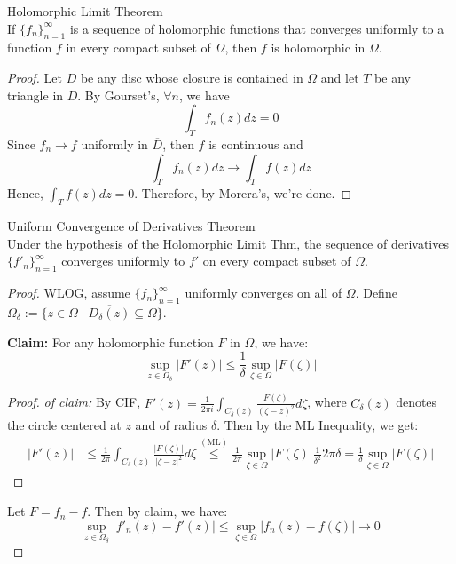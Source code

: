 \begin{theorem}{Holomorphic Limit Theorem}\\
If $\{f_n\}_{n=1}^\infty$ is a sequence of holomorphic functions that converges uniformly to a function $f$ in every compact subset of $\Omega$, then $f$ is holomorphic in $\Omega$.
\end{theorem}

\begin{proof}
    Let $D$ be any disc whose closure is contained in $\Omega$ and let $T$ be any triangle in $D$. By Gourset's, $\forall n$, we have
    \[
    \int_T f_n(z)dz=0
    \]
    Since $f_n\to f$ uniformly in $\overline{D}$, then $f$ is continuous and
    \[
    \int_Tf_n(z)dz \to \int_T f(z)dz
    \]
    Hence, $\int_T f(z)dz=0$. Therefore, by Morera's, we're done.
\end{proof}

\begin{theorem}{Uniform Convergence of Derivatives Theorem}\\
Under the hypothesis of the Holomorphic Limit Thm, the sequence of derivatives $\{f'_n \}_{n=1}^\infty$ converges uniformly to $f'$ on every compact subset of $\Omega$.
\end{theorem}

\begin{proof}
    WLOG, assume $\{f_n\}_{n=1}^\infty$ uniformly converges on all of $\Omega$. Define $\Omega _\delta:= \{z\in \Omega \mid \overline{D_\delta (z)} \subseteq \Omega \}$.

    \noindent\textbf{Claim:} For any holomorphic function $F$ in $\Omega$, we have:
    \[
    \sup_{z\in \Omega_\delta} |F'(z)| \leq \frac{1}{\delta} \sup_{\zeta \in \Omega} |F(\zeta) |
    \]
    \begin{proof}
        \textit{of claim:} By CIF, $F'(z)= \frac{1}{2\pi i} \int_{C_\delta (z)} \frac{F(\zeta)}{(\zeta- z)^2} d\zeta$, where $C_\delta (z)$ denotes the circle centered at $z$ and of radius $\delta$. Then by the ML Inequality, we get:
        \begin{align*}
            |F'(z)| &\leq \frac{1}{2\pi} \int_{C_\delta(z)} \frac{|F( \zeta )|}{|\zeta-z|^2} d\zeta \overset{(\text{ML})}{\leq} \frac{1}{2\pi} \sup_{\zeta \in \Omega} |F(\zeta)| \frac{1}{\delta^2} 2\pi \delta= \frac{1}{\delta} \sup_{\zeta \in \Omega} |F(\zeta)|
        \end{align*}
    \end{proof}
    Let $F=f_n-f$. Then by claim, we have:
    \[
    \sup_{z \in \Omega_\delta} |f'_n(z) -f'(z)| \leq \sup_{\zeta\in \Omega} |f_n(z)- f(\zeta)| \to 0
    \]
\end{proof}

